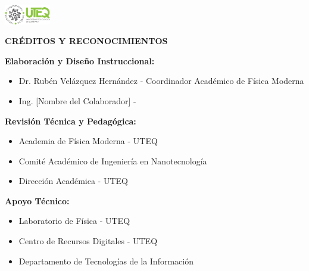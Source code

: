 \documentclass[12pt,a4paper]{book}
\begin{document}
\begin{titlepage}
\begin{center}
			
			\hspace{2cm}
			\includegraphics[width=2cm]{../../Imagenes/Logo_uteq}
			
		\end{center}
	\end{titlepage}
	
	\thispagestyle{empty}
	\vspace*{1cm}
	
	\begin{center}
		\textbf{\Large CRÉDITOS Y RECONOCIMIENTOS}
	\end{center}
	
	\vspace{1cm}
	
	\textbf{Elaboración y Diseño Instruccional:}
	\begin{itemize}[leftmargin=2cm]
		\item Dr. Rubén Velázquez Hernández - Coordinador Académico de Física Moderna
		\item Ing. [Nombre del Colaborador] -
	\end{itemize}
	
	\textbf{Revisión Técnica y Pedagógica:}
	\begin{itemize}[leftmargin=2cm]
		\item Academia de Física Moderna - UTEQ
		\item Comité Académico de Ingeniería en Nanotecnología
		\item Dirección Académica - UTEQ
	\end{itemize}
	
	\textbf{Apoyo Técnico:}
	\begin{itemize}[leftmargin=2cm]
		\item Laboratorio de Física - UTEQ
		\item Centro de Recursos Digitales - UTEQ
		\item Departamento de Tecnologías de la Información
	\end{itemize}
	
\end{document}

